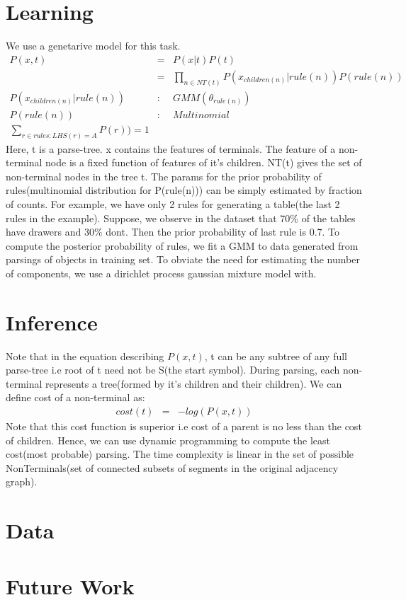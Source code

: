 \documentclass[11pt]{article} %
\begin{document}
\section{Learning}
We use a genetarive model for this task.
\begin{eqnarray}
P(x,t)&=&P(x|t)P(t) \\
&=& \prod_{n \in NT(t)}{P(x_{children(n)} |rule(n) )P(rule(n))}\\
P(x_{children(n)} |rule(n) ) &:& GMM(\theta _{rule(n)})\\
P(rule(n)) &:& Multinomial \\
\sum_{r \in rules:LHS(r)=A}{P(r))}=1
\end{eqnarray}
Here, t is a parse-tree. x contains the features of terminals. The feature of a non-terminal node is a fixed function of features of it's children. NT(t) gives the set of non-terminal nodes in the tree t.
The params for the prior probability of rules(multinomial distribution for P(rule(n))) can be simply estimated by fraction of counts. For example, we have only 2 rules for generating a table(the last 2 rules in the example). Suppose, we observe in the dataset that 70\% of the tables have drawers and 30\% dont. Then the prior probability of last rule is 0.7.
To compute the posterior probability of rules, we fit a GMM to data generated from parsings of objects in training set. To obviate the need for estimating the number of components, we use a dirichlet process gaussian mixture model with. 

\section{Inference}
Note that in the equation describing $P(x,t)$, t can be any subtree of any full parse-tree i.e root of t need not be S(the start symbol). During parsing, each non-terminal represents a tree(formed by it's children and their children). We can define cost of a non-terminal as:
\begin{eqnarray}
cost(t)&=&-log(P(x,t))
\end{eqnarray}
 Note that this cost function is superior i.e cost of a parent is no less than the cost of children. Hence, we can use dynamic programming to compute the least cost(most probable) parsing. The time complexity is linear in the set of possible NonTerminals(set of connected subsets of segments in the original adjacency graph). 
\section{Data}
\section{Future Work}

{  


}
\end{document}
